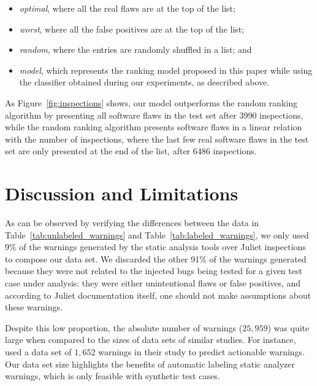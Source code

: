 \begin{itemize}
\item\textit{optimal}, where all the real flaws are at the top of the list;
\item\textit{worst}, where all the false positives are at the top of the list;
\item\textit{random}, where the entries are randomly shuffled in a list; and
\item\textit{model}, which represents the ranking model proposed in this paper while
using the classifier obtained during our experiments, as described above.
\end{itemize}

As Figure~\ref{fig:inspections} shows, our model outperforms the random ranking
algorithm by presenting all software flaws in the test set after 3990
inspections, while the random ranking algorithm presents software flaws in a
linear relation with the number of inspections, where the last few real
software flaws in the test set are only presented at the end of the list, after
6486 inspections.


\section{Discussion and Limitations}
\label{sec:discussion}

As can be observed by verifying the differences between the data in
Table~\ref{tab:unlabeled_warnings} and Table~\ref{tab:labeled_warnings}, we
only used 9\% of the warnings generated by the static analysis tools over
Juliet inspections to compose our data set. We discarded the other 91\% of the
warnings generated because they were not related to the injected bugs being
tested for a given test case under analysis: they were either unintentional
flaws or false positives, and according to Juliet documentation itself, one
should not make assumptions about these warnings.

Despite this low proportion, the absolute number of warnings ($25,959$) was quite large
when compared to the sizes of data sets of similar studies. For instance,
\cite{ruthruff_predicting_2008} used a data set of $1,652$ warnings in
their study to predict actionable warnings. Our data set size highlights the
benefits of automatic labeling static analyzer warnings, which is only feasible
with synthetic test cases.


